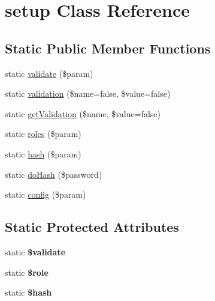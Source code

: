 \hypertarget{classcommon_1_1user_1_1legacy_1_1setup}{\section{setup \-Class \-Reference}
\label{classcommon_1_1user_1_1legacy_1_1setup}
}
\subsection*{\-Static \-Public \-Member \-Functions}
\begin{DoxyCompactItemize}
\item 
static \hyperlink{classcommon_1_1user_1_1legacy_1_1setup_a6594137c5dfb8c7b7aa86268554739f5}{validate} (\$param)
\item 
static \hyperlink{classcommon_1_1user_1_1legacy_1_1setup_a0d63aec80fb945ee3a1f6043e2156051}{validation} (\$name=false, \$value=false)
\item 
static \hyperlink{classcommon_1_1user_1_1legacy_1_1setup_a56a894c1e0254e39bad346796912a25f}{get\-Validation} (\$name, \$value=false)
\item 
static \hyperlink{classcommon_1_1user_1_1legacy_1_1setup_a716abcfa0c82470936af05770e097fb4}{roles} (\$param)
\item 
static \hyperlink{classcommon_1_1user_1_1legacy_1_1setup_a37f9c9ca7c534dcd0ebc756d02276f4b}{hash} (\$param)
\item 
static \hyperlink{classcommon_1_1user_1_1legacy_1_1setup_aea1b41fea0ab30f27a2f08c3f3496aa6}{do\-Hash} (\$password)
\item 
static \hyperlink{classcommon_1_1user_1_1legacy_1_1setup_a376787b8c2b00d5181871734ea6c4c06}{config} (\$param)
\end{DoxyCompactItemize}
\subsection*{\-Static \-Protected \-Attributes}
\begin{DoxyCompactItemize}
\item 
\hypertarget{classcommon_1_1user_1_1legacy_1_1setup_a320b75b46e1832c327d9d47b4cea9e7d}{static {\bfseries \$validate}}\label{classcommon_1_1user_1_1legacy_1_1setup_a320b75b46e1832c327d9d47b4cea9e7d}

\item 
\hypertarget{classcommon_1_1user_1_1legacy_1_1setup_a1ea903cca285c7c0b4c9203932100309}{static {\bfseries \$role}}\label{classcommon_1_1user_1_1legacy_1_1setup_a1ea903cca285c7c0b4c9203932100309}

\item 
\hypertarget{classcommon_1_1user_1_1legacy_1_1setup_ac9fdf6f2c8fb45c1d3bb9a176802b2ad}{static {\bfseries \$hash}}\label{classcommon_1_1user_1_1legacy_1_1setup_ac9fdf6f2c8fb45c1d3bb9a176802b2ad}

\end{DoxyCompactItemize}


